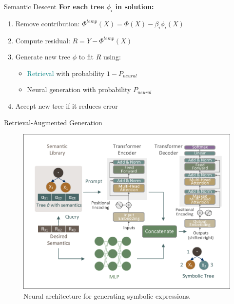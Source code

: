 \documentclass[final]{beamer}
\newcommand{\hlblue}[1]{\textcolor{mainblue}{#1}}
\newcommand{\hlpurple}[1]{\textcolor{deepplum}{#1}}
\newcommand{\hlteal}[1]{\textcolor{teal}{#1}}
\newlength{\onecolwid}
\begin{document}
\begin{frame}[t]
\begin{columns}[t]
\begin{column}{\onecolwid}
                \begin{block}{Semantic Descent}
                    \textbf{\hlblue{For each tree $\phi_i$ in solution:}}
                    \begin{enumerate}
                        \item Remove contribution: $\Phi^{temp}(X) = \Phi(X) - \beta_i \phi_i(X)$
                        \item Compute residual: $R = Y - \Phi^{temp}(X)$
                        \item Generate new tree $\phi$ to fit $R$ using:
                        \begin{itemize}
                            \item \hlteal{Retrieval} with probability $1-P_{neural}$
                            \item \hlpurple{Neural generation} with probability $P_{neural}$
                        \end{itemize}
                        \item Accept new tree if it reduces error
                    \end{enumerate}
                \end{block}


                \begin{block}{Retrieval-Augmented Generation}
                    \begin{figure}
                        \centering
                        \includegraphics[width=\linewidth, trim=25 20 15 10, clip]{figs/Transformer.pdf}
                        \caption{Neural architecture for generating symbolic expressions.}
                    \end{figure}


\end{block}
\end{column}
\end{columns}
\end{frame}
\end{document}
